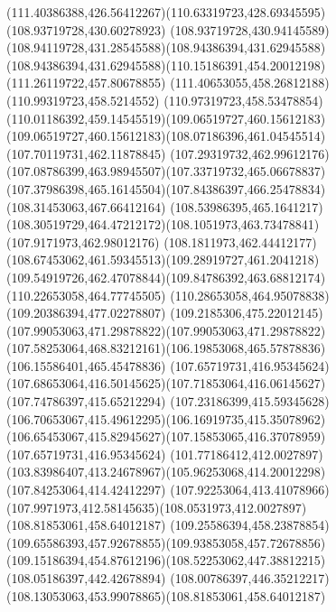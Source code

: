 {{\curveto(111.40386388,426.56412267)(110.63319723,428.69345595)(108.93719728,430.60278923)
\curveto(108.93719728,430.94145589)(108.94119728,431.28545588)(108.94386394,431.62945588)
\curveto(108.94386394,431.62945588)(110.15186391,454.20012198)(111.26119722,457.80678855)
\lineto(111.40653055,458.26812188)
\lineto(110.99319723,458.5214552)
\curveto(110.97319723,458.53478854)(110.01186392,459.14545519)(109.06519727,460.15612183)
\curveto(109.06519727,460.15612183)(108.07186396,461.04545514)(107.70119731,462.11878845)
\curveto(107.29319732,462.99612176)(107.08786399,463.98945507)(107.33719732,465.06678837)
\curveto(107.37986398,465.16145504)(107.84386397,466.25478834)(108.31453063,467.66412164)
\lineto(108.53986395,465.1641217)
\curveto(108.30519729,464.47212172)(108.1051973,463.73478841)(107.9171973,462.98012176)
\curveto(108.1811973,462.44412177)(108.67453062,461.59345513)(109.28919727,461.2041218)
\curveto(109.54919726,462.47078844)(109.84786392,463.68812174)(110.22653058,464.77745505)
\lineto(110.28653058,464.95078838)
\lineto(109.20386394,477.02278807)
\curveto(109.2185306,475.22012145)(107.99053063,471.29878822)(107.99053063,471.29878822)
\curveto(107.58253064,468.83212161)(106.19853068,465.57878836)(106.15586401,465.45478836)
\moveto(107.65719731,416.95345624)
\curveto(107.68653064,416.50145625)(107.71853064,416.06145627)(107.74786397,415.65212294)
\curveto(107.23186399,415.59345628)(106.70653067,415.49612295)(106.16919735,415.35078962)
\curveto(106.65453067,415.82945627)(107.15853065,416.37078959)(107.65719731,416.95345624)
\moveto(101.77186412,412.0027897)
\curveto(103.83986407,413.24678967)(105.96253068,414.20012298)(107.84253064,414.42412297)
\curveto(107.92253064,413.41078966)(107.9971973,412.58145635)(108.0531973,412.0027897)
\closepath
\moveto(108.81853061,458.64012187)
\curveto(109.25586394,458.23878854)(109.65586393,457.92678855)(109.93853058,457.72678856)
\curveto(109.15186394,454.87612196)(108.52253062,447.38812215)(108.05186397,442.42678894)
\curveto(108.00786397,446.35212217)(108.13053063,453.99078865)(108.81853061,458.64012187)
}
}
{
}
